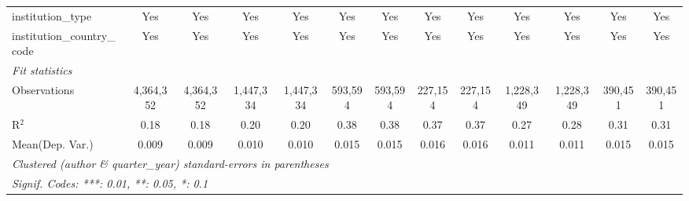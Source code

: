 \begin{tabular}{lcccccccccccc}
   institution\_type                        & Yes            & Yes             & Yes            & Yes             & Yes            & Yes            & Yes           & Yes            & Yes            & Yes             & Yes            & Yes\\  
   institution\_country\_code               & Yes            & Yes             & Yes            & Yes             & Yes            & Yes            & Yes           & Yes            & Yes            & Yes             & Yes            & Yes\\  
   \midrule
   \emph{Fit statistics}\\
   Observations                             & 4,364,352      & 4,364,352       & 1,447,334      & 1,447,334       & 593,594        & 593,594        & 227,154       & 227,154        & 1,228,349      & 1,228,349       & 390,451        & 390,451\\  
   R$^2$                                    & 0.18           & 0.18            & 0.20           & 0.20            & 0.38           & 0.38           & 0.37          & 0.37           & 0.27           & 0.28            & 0.31           & 0.31\\  
Mean(Dep. Var.) & 0.009 & 0.009 & 0.010 & 0.010 & 0.015 & 0.015 & 0.016 & 0.016 & 0.011 & 0.011 & 0.015 & 0.015 \\
   \midrule \midrule
   \multicolumn{13}{l}{\emph{Clustered (author \& quarter\_year) standard-errors in parentheses}}\\
   \multicolumn{13}{l}{\emph{Signif. Codes: ***: 0.01, **: 0.05, *: 0.1}}\\
\end{tabular}
\par\endgroup
